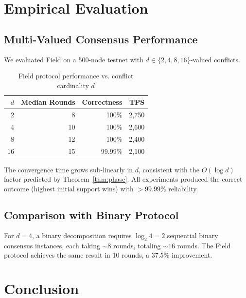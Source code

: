 \documentclass[11pt,a4paper]{article}
\begin{document}
\section{Empirical Evaluation}
\label{sec:evaluation}

\subsection{Multi-Valued Consensus Performance}

We evaluated Field on a 500-node testnet with $d \in \{2, 4, 8, 16\}$-valued conflicts.

\begin{table}[h]
\centering
\begin{tabular}{@{}rrrr@{}}
\toprule
$d$ & \textbf{Median Rounds} & \textbf{Correctness} & \textbf{TPS} \\
\midrule
2 & 8 & 100\% & 2,750 \\
4 & 10 & 100\% & 2,600 \\
8 & 12 & 100\% & 2,400 \\
16 & 15 & 99.99\% & 2,100 \\
\bottomrule
\end{tabular}
\caption{Field protocol performance vs. conflict cardinality $d$}
\label{tab:multival}
\end{table}

The convergence time grows sub-linearly in $d$, consistent with the $O(\log d)$ factor
predicted by Theorem~\ref{thm:phase}. All experiments produced the correct outcome
(highest initial support wins) with $> 99.99\%$ reliability.

\subsection{Comparison with Binary Protocol}

For $d = 4$, a binary decomposition requires $\log_2 4 = 2$ sequential binary consensus
instances, each taking $\sim 8$ rounds, totaling $\sim 16$ rounds. The Field protocol
achieves the same result in 10 rounds, a 37.5\% improvement.

\section{Conclusion}
\label{sec:conclusion}
\end{document}
